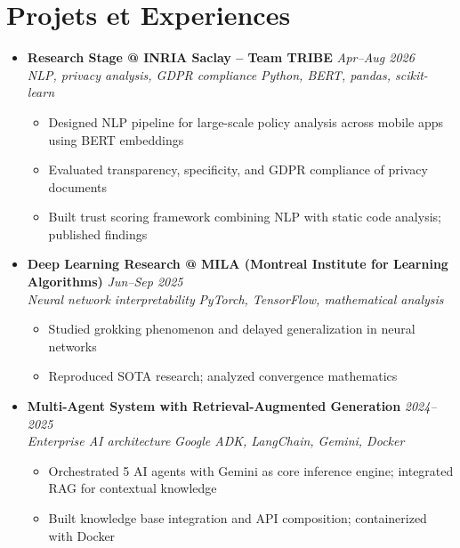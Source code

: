 \documentclass[a4paper,11pt]{article}
\begin{document}
\section{Projets et Experiences}
\begin{itemize}[leftmargin=*, label={-}]

\item \textbf{Research Stage @ INRIA Saclay -- Team TRIBE} \hfill \textit{Apr--Aug 2026} \\
\textit{NLP, privacy analysis, GDPR compliance} \hfill \textit{Python, BERT, pandas, scikit-learn}
\vspace{-2pt}
    \begin{itemize}[leftmargin=0.4cm, nosep, label=\tiny$\bullet$]
        \item \small{Designed NLP pipeline for large-scale policy analysis across mobile apps using BERT embeddings}
        \item \small{Evaluated transparency, specificity, and GDPR compliance of privacy documents}
        \item \small{Built trust scoring framework combining NLP with static code analysis; published findings}
    \end{itemize}
\vspace{3pt}

\item \textbf{Deep Learning Research @ MILA (Montreal Institute for Learning Algorithms)} \hfill \textit{Jun--Sep 2025} \\
\textit{Neural network interpretability} \hfill \textit{PyTorch, TensorFlow, mathematical analysis}
\vspace{-2pt}
    \begin{itemize}[leftmargin=0.4cm, nosep, label=\tiny$\bullet$]
        \item \small{Studied grokking phenomenon and delayed generalization in neural networks}
        \item \small{Reproduced SOTA research; analyzed convergence mathematics}
    \end{itemize}
\vspace{3pt}

\item \textbf{Multi-Agent System with Retrieval-Augmented Generation} \hfill \textit{2024--2025} \\
\textit{Enterprise AI architecture} \hfill \textit{Google ADK, LangChain, Gemini, Docker}
\vspace{-2pt}
    \begin{itemize}[leftmargin=0.4cm, nosep, label=\tiny$\bullet$]
        \item \small{Orchestrated 5 AI agents with Gemini as core inference engine; integrated RAG for contextual knowledge}
        \item \small{Built knowledge base integration and API composition; containerized with Docker}
    \end{itemize}
\vspace{3pt}


\end{itemize}
\end{document}
